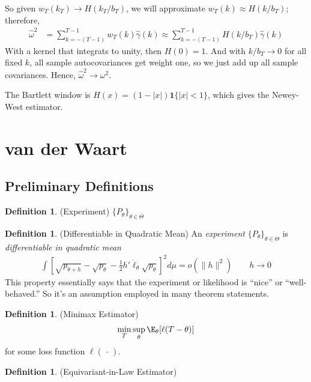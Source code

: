 \documentclass[12pt]{article}
\theoremstyle{plain}
\theoremstyle{definition}
\newtheorem{defn}[thm]{Definition}
\theoremstyle{remark}
\newcommand{\ra}{\rightarrow}
\begin{document}
So given $w_T(k_T)\ra H(k_T/b_T)$, we will approximate
$w_T(k)\approx H(k/b_T)$; therefore,
\begin{align*}
  \hat{\omega}^2
  &=
  \sum_{k=-(T-1)}^{T-1}
  w_T(k)
  \hat{\gamma}(k)
  \approx
  \sum_{k=-(T-1)}^{T-1}
  H(k/b_T)
  \hat{\gamma}(k)
\end{align*}
With a kernel that integrats to unity, then $H(0)=1$.
And with $k/b_T\ra 0$ for all fixed $k$, all sample autocovariances get
weight one, so we just add up all sample covariances. Hence,
$\hat{\omega}^2\ra\omega^2$.

The Bartlett window is $H(x)=(1-|x|)\mathbf{1}\{|x|<1\}$, which gives
the Newey-West estimator.




\clearpage
\section{van der Waart}

\subsection{Preliminary Definitions}

\begin{defn}(Experiment)
$\{P_\theta\}_{\theta\in\Theta}$
\end{defn}

\begin{defn}(Differentiable in Quadratic Mean)
An \emph{experiment}
$\{P_\theta\}_{\theta\in\Theta}$
is \emph{differentiable in quadratic mean}
\begin{align*}
  \int
  \left[
    \sqrt{p_{\theta+h}}
    -
    \sqrt{p_{\theta}}
    -
    \frac{1}{2}
    h'\dot{\ell}_\theta
    \sqrt{p_\theta}
  \right]^2
  d\mu
  =
  o(\lVert h\rVert^2)
  \qquad
  h\ra 0
\end{align*}
This property essentially says that the experiment or likelihood is
``nice'' or ``well-behaved.''
So it's an assumption employed in many theorem statements.
\end{defn}


\begin{defn}
(Minimax Estimator)
\begin{align*}
  \min_T
  \sup_\theta
  \E_\theta[\ell(T-\theta)]
\end{align*}
for some loss function $\ell(\,\cdot\,)$.
\end{defn}


\begin{defn}
(Equivariant-in-Law Estimator)
\end{defn}
\end{document}
